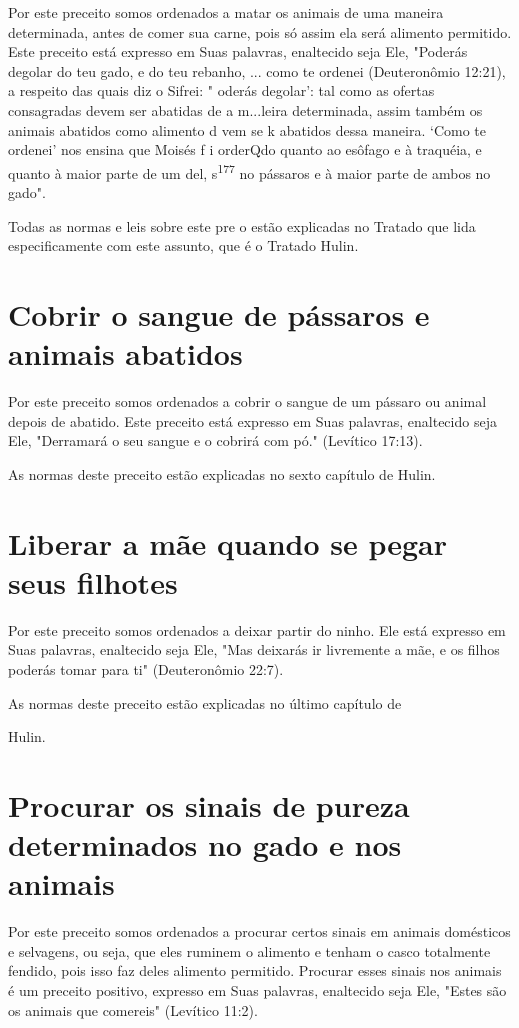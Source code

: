 \begin{itemize}
\begin{enumrate}
\begin{itemize}
\begin{itemize}
\begin{itemize}
Por este preceito somos ordenados a matar os animais de uma ma­neira
determinada, antes de comer sua carne, pois só assim ela será alimento
permitido. Este preceito está expresso em Suas palavras, enaltecido seja
Ele, "Poderás degolar do teu gado, e do teu rebanho, ... como te ordenei
(Deutero­nômio 12:21), a respeito das quais diz o Sifrei: " oderás
degolar': tal como as ofertas consagradas devem ser abatidas de a
m...leira determinada, assim também os animais
abatidos como alimento d vem se k abatidos dessa maneira. `Como te
ordenei' nos ensina que Moisés f i orderQdo quanto ao esôfago e à
traquéia, e quanto à maior parte de um del, s\textsuperscript{177} no
pássaros e à maior parte de ambos no gado".

Todas as normas e leis sobre este pre o estão explicadas no Trata­do que
lida especificamente com este assunto, que é o Tratado Hulin.

\section{Cobrir o sangue de pássaros e animais abatidos}

Por este preceito somos ordenados a cobrir o sangue de um pássaro ou
animal depois de abatido. Este preceito está expresso em Suas palavras,
enal­tecido seja Ele, "Derramará o seu sangue e o cobrirá com pó."
(Levítico 17:13).




As normas deste preceito estão explicadas no sexto capítulo de Hulin.


\section{Liberar a mãe quando se pegar seus filhotes}

Por este preceito somos ordenados a deixar partir do ninho. Ele está
expresso em Suas palavras, enaltecido seja Ele, "Mas deixarás ir
livremente a mãe, e os filhos poderás tomar para ti" (Deuteronômio
22:7).


As normas deste preceito estão explicadas no último capítulo de


Hulin.

\section{Procurar os sinais de pureza determinados no gado e nos animais}

Por este preceito somos ordenados a procurar certos sinais em ani­mais
domésticos e selvagens, ou seja, que eles ruminem o alimento e tenham o
casco totalmente fendido, pois isso faz deles alimento permitido.
Procurar esses sinais nos animais é um preceito positivo, expresso em
Suas palavras, enal­tecido seja Ele, "Estes são os animais que comereis"
(Levítico 11:2).


\end{itemize}
\end{itemize}
\end{itemize}
\end{enumrate}
\end{itemize}
